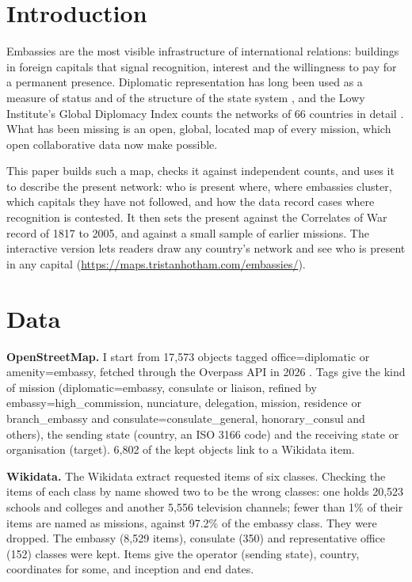 \documentclass[11pt,a4paper]{article}
\begin{document}
\section{Introduction}
Embassies are the most visible infrastructure of international relations: buildings in foreign capitals that signal recognition, interest and the willingness to pay for a permanent presence. Diplomatic representation has long been used as a measure of status and of the structure of the state system \citep{bayer}, and the Lowy Institute's Global Diplomacy Index counts the networks of 66 countries in detail \citep{lowy}. What has been missing is an open, global, located map of every mission, which open collaborative data now make possible.

This paper builds such a map, checks it against independent counts, and uses it to describe the present network: who is present where, where embassies cluster, which capitals they have not followed, and how the data record cases where recognition is contested. It then sets the present against the Correlates of War record of 1817 to 2005, and against a small sample of earlier missions. The interactive version lets readers draw any country's network and see who is present in any capital (\url{https://maps.tristanhotham.com/embassies/}).

\section{Data}
\textbf{OpenStreetMap.} I start from 17,573 objects tagged office=diplomatic or amenity=embassy, fetched through the Overpass API in 2026 \citep{osm}. Tags give the kind of mission (diplomatic=embassy, consulate or liaison, refined by embassy=high\_commission, nunciature, delegation, mission, residence or branch\_embassy and consulate=consulate\_general, honorary\_consul and others), the sending state (country, an ISO 3166 code) and the receiving state or organisation (target). 6,802 of the kept objects link to a Wikidata item.

\textbf{Wikidata.} The Wikidata extract \citep{wikidata} requested items of six classes. Checking the items of each class by name showed two to be the wrong classes: one holds 20,523 schools and colleges and another 5,556 television channels; fewer than 1\% of their items are named as missions, against 97.2\% of the embassy class. They were dropped. The embassy (8,529 items), consulate (350) and representative office (152) classes were kept. Items give the operator (sending state), country, coordinates for some, and inception and end dates.
\end{document}
